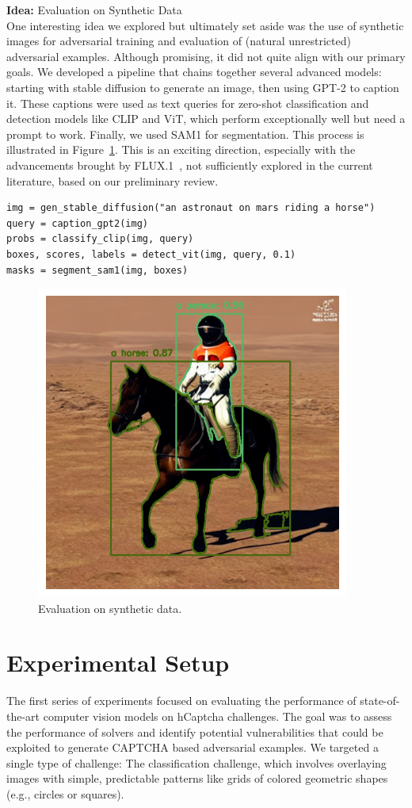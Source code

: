 \documentclass[a4paper, oneside]{discothesis}
\begin{document}
\begin{highlightbox}
	\textbf{Idea:} Evaluation on Synthetic Data \\

	One interesting idea we explored but ultimately set aside was the use of synthetic images for adversarial training and evaluation of (natural unrestricted) adversarial examples. Although promising, it did not quite align with our primary goals. We developed a pipeline that chains together several advanced models: starting with stable diffusion to generate an image, then using GPT-2 to caption it. These captions were used as text queries for zero-shot classification and detection models like CLIP and ViT, which perform exceptionally well but need a prompt to work. Finally, we used SAM1 for segmentation. This process is illustrated in Figure~\ref{fig:chained}. This is an exciting direction, especially with the advancements brought by FLUX.1~\cite{BlackForestLabs2024FLUX}, not sufficiently explored in the current literature, based on our preliminary review. \\

\begin{verbatim}
img = gen_stable_diffusion("an astronaut on mars riding a horse")
query = caption_gpt2(img)
probs = classify_clip(img, query)
boxes, scores, labels = detect_vit(img, query, 0.1)
masks = segment_sam1(img, boxes)
\end{verbatim}
\end{highlightbox}

\begin{figure}
	\centering
	\includegraphics[width=0.3\columnwidth]{figures/chained.png}
	\caption{Evaluation on synthetic data.}
	\label{fig:chained}
\end{figure}

\section{Experimental Setup}

The first series of experiments focused on evaluating the performance of state-of-the-art computer vision models on hCaptcha challenges. The goal was to assess the performance of solvers and identify potential vulnerabilities that could be exploited to generate CAPTCHA based adversarial examples. We targeted a single type of challenge: The classification challenge, which involves overlaying images with simple, predictable patterns like grids of colored geometric shapes (e.g., circles or squares).
\end{document}
